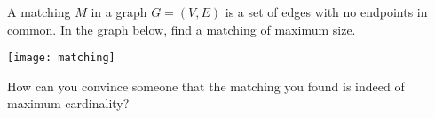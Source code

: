 \documentclass[12pt]{article}
\begin{document}

A matching $M$ in a graph $G=(V,E)$ is a set of edges with no
endpoints in common. In the graph below, find a matching of maximum
size. 

\begin{center}
\texttt{[image: matching]}
\end{center}

How can you convince someone that the matching you found is indeed of
maximum cardinality?
\end{document}
